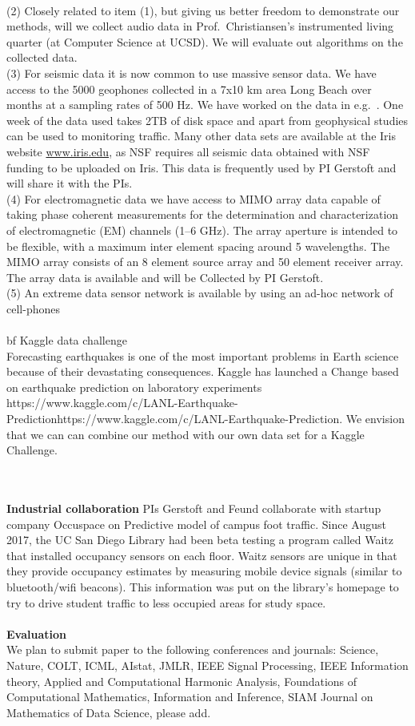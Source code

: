 \documentclass{article}
\begin{document}
\\
(2)
Closely related to item (1), but giving us better freedom to demonstrate our methods, will we collect audio data in Prof.\ Christiansen's instrumented living
quarter (at Computer Science at UCSD). We will evaluate out algorithms on the collected data.
\\
(3) For seismic data it is now common to use massive sensor data. We have access to the 5000 geophones collected in a 7x10 km area Long Beach over months at a sampling rates of 500 Hz. We have worked on the data in e.g.\ \cite{riahi2017}. One week of the data used takes 2TB of disk space and apart from geophysical studies can be used to monitoring traffic\cite{riahi2015}. Many other data sets are available at the Iris website \href{www.iris.edu}{www.iris.edu}, as NSF requires all seismic data obtained with NSF funding to be uploaded on Iris. This data is frequently used by PI Gerstoft and will share it with the PIs.
\\
(4) For electromagnetic data we have access to MIMO array data  capable of taking phase coherent measurements for the determination and characterization of electromagnetic (EM) channels (1--6 GHz). The array aperture is intended to be flexible, with a maximum inter element spacing around 5 wavelengths. The MIMO array consists of an 8 element source array and 50 element receiver array. The array data is available and will be Collected by PI Gerstoft.
\\
(5) An extreme data sensor network is available by using an ad-hoc network of cell-phones
\\
\\
{bf Kaggle data challenge}\\
Forecasting earthquakes is one of the most important problems in Earth science because of their devastating consequences. Kaggle has launched a Change based on earthquake prediction on laboratory experiments {https://www.kaggle.com/c/LANL-Earthquake-Prediction}{https://www.kaggle.com/c/LANL-Earthquake-Prediction}. We envision that we can can combine our method with our own data set for a Kaggle Challenge.  

\\
\\
{\bf Industrial collaboration}
PIs Gerstoft and Feund collaborate with startup company  Occuspace on
Predictive model of campus foot traffic. Since August 2017, the UC San Diego Library had been beta testing a program called Waitz that installed occupancy sensors on each floor. Waitz sensors are unique in that they provide occupancy estimates by measuring mobile device signals (similar to bluetooth/wifi beacons). This information was put on the library’s homepage to try to drive student traffic to less occupied areas for study space. 
\\
\\
{\bf Evaluation}\\
We plan to submit paper to the following conferences and journals:
Science, Nature, COLT, ICML, AIstat, JMLR, IEEE Signal Processing, IEEE Information
theory, Applied and Computational Harmonic Analysis, Foundations of Computational Mathematics, Information and Inference, SIAM Journal on Mathematics of Data Science, please add.
\end{document}
